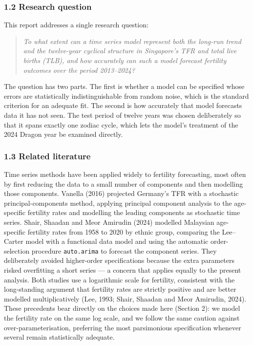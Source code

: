 \documentclass[
  11pt,
]{article}
\begin{document}
\subsubsection{1.2 Research question}\label{research-question}

This report addresses a single research question:

\begin{quote}
\emph{To what extent can a time series model represent both the long-run
trend and the twelve-year cyclical structure in Singapore's TFR and
total live births (TLB), and how accurately can such a model forecast
fertility outcomes over the period 2013--2024?}
\end{quote}

The question has two parts. The first is whether a model can be
specified whose errors are statistically indistinguishable from random
noise, which is the standard criterion for an adequate fit. The second
is how accurately that model forecasts data it has not seen. The test
period of twelve years was chosen deliberately so that it spans exactly
one zodiac cycle, which lets the model's treatment of the 2024 Dragon
year be examined directly.

\subsubsection{1.3 Related literature}\label{related-literature}

Time series methods have been applied widely to fertility forecasting,
most often by first reducing the data to a small number of components
and then modelling those components. Vanella (2016) projected Germany's
TFR with a stochastic principal-components method, applying principal
component analysis to the age-specific fertility rates and modelling the
leading components as stochastic time series. Shair, Shaadan and Meor
Amirudin (2024) modelled Malaysian age-specific fertility rates from
1958 to 2020 by ethnic group, comparing the Lee--Carter model with a
functional data model and using the automatic order-selection procedure
\texttt{auto.arima} to forecast the component series. They deliberately
avoided higher-order specifications because the extra parameters risked
overfitting a short series --- a concern that applies equally to the
present analysis. Both studies use a logarithmic scale for fertility,
consistent with the long-standing argument that fertility rates are
strictly positive and are better modelled multiplicatively (Lee, 1993;
Shair, Shaadan and Meor Amirudin, 2024). These precedents bear directly
on the choices made here (Section 2): we model the fertility rate on the
same log scale, and we follow the same caution against
over-parameterisation, preferring the most parsimonious specification
whenever several remain statistically adequate.
\end{document}
